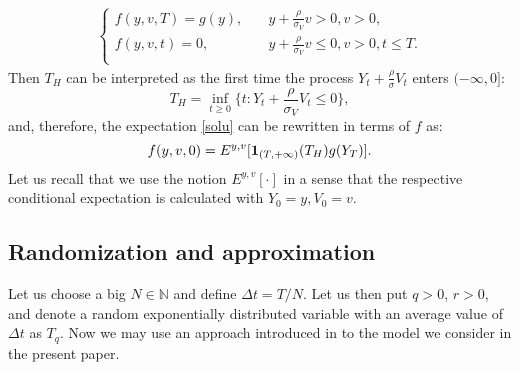 \documentclass[a4paper]{jpconf}
\begin{document}
{\begin{equation}
\begin{array}{l}
\begin{cases}
f(y,v,T) = g(y), \quad &y+\frac{\rho}{\sigma_V}v>0, v > 0, \\
f(y,v,t) = 0, \quad &y + \frac{\rho}{\sigma_V}v\le 0, v > 0, t \le T.\\
\end{cases}
\end{array}
\end{equation}
Then $T_H$ can be interpreted as the first time the process $Y_t + \frac{\rho}{\sigma}V_t$ enters $(-\infty, 0]$:
$$T_H = \inf_{t \ge 0}\{t: Y_t +\frac{\rho}{\sigma_V}V_t \le 0\},$$
and, therefore, the expectation \eqref{solu} can be rewritten in terms of $f$ as:
\begin{equation} \label{expectation-subst}
f(y,v,0) = E^{y,v}[{\bf 1}_{(T, +\infty)}(T_H) g(Y_T)].
\end{equation}
Let us recall that we use the notion $E^{y,v}[\cdot]$ in a sense that the respective conditional expectation is calculated with $Y_0 = y, V_0 = v$.

\subsection{Randomization and approximation}
Let us choose a big $N \in \mathbb{N}$ and define $\Delta t = T/N$. Let us then put $q>0$, $r>0$, and denote a random exponentially distributed variable with an average value of $\Delta t$ as $T_q$. Now we may use an approach introduced in \cite{kudr_jopcs} to the model we consider in the present paper.

}
\end{document}
